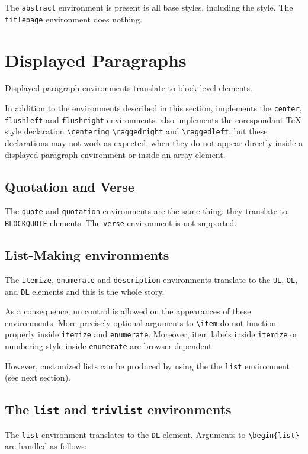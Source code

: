 The \verb+abstract+ environment is present is all base styles,
including the  style.
The \verb+titlepage+ environment does nothing.

\section{Displayed Paragraphs}
Displayed-paragraph environments translate to block-level
elements.

In addition to the environments described in this section,
\hevea{} implements the \verb+center+, \verb+flushleft+ and
\verb+flushright+ environments.
\hevea{} also implements the corespondant \TeX{} style declaration
\verb+\centering+ \verb+\raggedright+ and \verb+\raggedleft+,
but these declarations may not work as expected, when they do not
appear directly inside a displayed-paragraph environment or inside an array
element.



\subsection{Quotation and Verse}
The \verb+quote+ and \verb+quotation+ environments are the same thing: they
translate to \verb+BLOCKQUOTE+ elements.
The \verb+verse+ environment is not supported.

\subsection{List-Making environments}
The \verb+itemize+, \verb+enumerate+ and \verb+description+
environments translate to the \verb+UL+, \verb+OL+, and
\verb+DL+ elements and this is the whole story.

As a consequence, no control is allowed on the appearances of these
environments.  More precisely optional arguments to \verb+\item+ do not
function properly inside \verb+itemize+ and \verb+enumerate+.  Moreover, item
labels inside \verb+itemize+ or numbering style inside \verb+enumerate+
are browser dependent.

However, customized lists can be produced by using the
the \texttt{list} environment (see next section).


\subsection{The \protect\texttt{list} and \protect\texttt{trivlist}
environments}
The \verb+list+ environment translates to the
\verb+DL+ element.
Arguments to \verb+\begin{list}+ are handled as follows:

